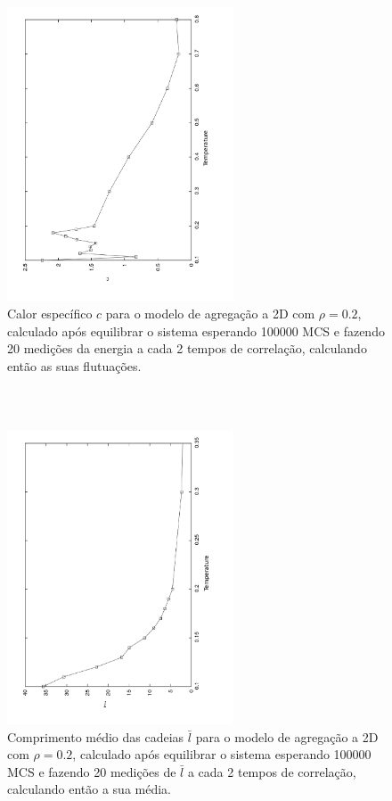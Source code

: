 \documentclass[11pt]{beamer}
\begin{document}
\begin{frame}
\frametitle{\insertsection \\ {\small \insertsubsection}}
\begin{figure}
	\centering
		\includegraphics[angle=-90, clip, trim = 1cm 2cm 1cm 1cm, width=0.6\textwidth]{images/c2d}
	\caption{{\footnotesize Calor específico $c$ para o modelo de agregação a 2D com $\rho = 0.2$, calculado após equilibrar o sistema esperando 100000 MCS e fazendo 20 medições da energia a cada 2 tempos de correlação, calculando então as suas flutuações.}}
	\label{fig:4}
\end{figure}
\end{frame}

\begin{frame}
\frametitle{\insertsection \\ {\small \insertsubsection}}
\begin{figure}
	\centering
		\includegraphics[angle=-90, clip, trim = 1cm 2cm 1cm 1cm, width=0.6\textwidth]{images/lav2d}
	\caption{{\footnotesize Comprimento médio das cadeias $\bar{l}$ para o modelo de agregação a 2D com $\rho = 0.2$, calculado após equilibrar o sistema esperando 100000 MCS e fazendo 20 medições de $\bar{l}$ a cada 2 tempos de correlação, calculando então a sua média.}}
	\label{fig:5}
\end{figure}
\end{frame}
\end{document}
